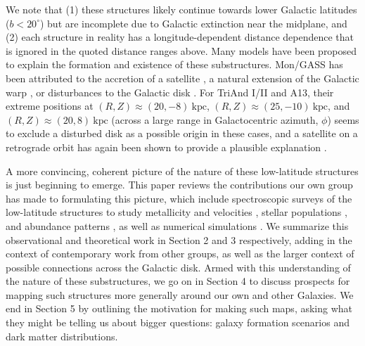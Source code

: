 \documentclass[galaxies,article,submit,moreauthors,pdftex,10pt,a4paper]{mdpi}
\newcommand{\kpc}{\mathrm{kpc}}
\begin{document}
We note that (1) these structures likely continue towards lower Galactic
latitudes ($b < 20^\circ$) but are incomplete due to Galactic extinction near
the midplane, and (2) each structure in reality has a longitude-dependent
distance dependence that is ignored in the quoted distance ranges above.
Many models have been proposed to explain the formation and existence of these
substructures.
Mon/GASS has been attributed to the accretion of a satellite \citep[on a retrograde orbit][]{penarrubia05, michel-dansac11}, a natural extension of the Galactic warp \citep{momany04,momany06}, or disturbances to the Galactic disk \citep{kazantzidis08,younger08,purcell11,xu15,gomez16}.
For TriAnd I/II and A13, their extreme positions at $(R,Z) \approx (20, -8)~\kpc$, $(R,Z) \approx (25, -10)~\kpc$, and $(R,Z) \approx (20, 8)~\kpc$ (across a large range in Galactocentric azimuth, $\phi$) seems to exclude a disturbed disk as a possible origin in these cases, and a satellite on a retrograde orbit has again been shown to provide a plausible explanation \citep{sheffield14}.

A more convincing, coherent picture of the nature of these low-latitude structures is just beginning to emerge.
This paper reviews the contributions our own group has made to formulating this picture, which include spectroscopic surveys of the low-latitude structures to study metallicity and velocities \citep{sheffield14,ting17}, stellar populations \citep{pricewhelan15,sheffield17}, and abundance patterns \citep{bergemann17}, as well as numerical simulations \citep{sheffield14,laporte17a,laporte17b}.
We summarize this observational and theoretical work in Section 2 and 3 respectively, adding in the context of contemporary work from other groups, as well as the larger context of possible connections across the Galactic disk.
Armed with this understanding of the nature of these substructures, we go on in Section 4 to discuss prospects for mapping such structures more generally around our own and other Galaxies.
We end in Section 5 by outlining the motivation for making such maps, asking what they might be telling us about bigger questions: galaxy formation scenarios and dark matter distributions.
\end{document}
